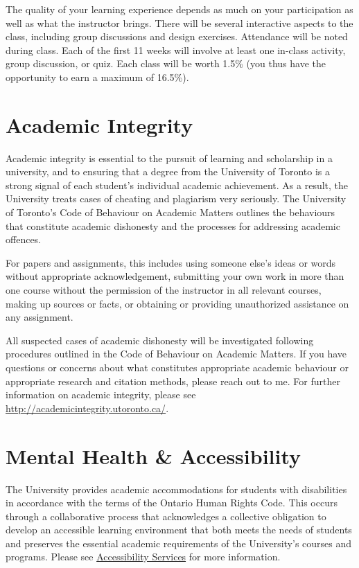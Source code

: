 \documentclass[11pt]{article}
\begin{document}
	The quality of your learning experience depends as much on your participation as well as what the instructor brings. There will be several interactive aspects to the class, including group discussions and design exercises. Attendance will be noted during class. Each of the first 11 weeks will involve at least one in-class activity, group discussion, or quiz. Each class will be worth 1.5\% (you thus have the opportunity to earn a maximum of 16.5\%).
	
	
	
	
	
	\section*{Academic Integrity}
	
	Academic integrity is essential to the pursuit of learning and scholarship in a university, and to ensuring that a degree from the University of Toronto is a strong signal of each student’s individual academic achievement. As a result, the University treats cases of cheating and plagiarism very seriously. The University of Toronto's Code of Behaviour on Academic Matters outlines the behaviours that constitute academic dishonesty and the processes for addressing academic offences. 
	
	For papers and assignments, this includes using someone else's ideas or words without appropriate acknowledgement, submitting your own work in more than one course without the permission of the instructor in all relevant courses,	making up sources or facts, or obtaining or providing unauthorized assistance on any assignment.
	
	All suspected cases of academic dishonesty will be investigated following procedures outlined in the Code of Behaviour on Academic Matters. If you have questions or concerns about what constitutes appropriate academic behaviour or appropriate research and citation methods, please reach out to me. For further information on academic integrity, please see \url{http://academicintegrity.utoronto.ca/}.
	
	
	\section*{Mental Health \& Accessibility}
	
	The University provides academic accommodations for students with disabilities in accordance with the terms of the Ontario Human Rights Code. This occurs through a collaborative process that acknowledges a collective obligation to develop an accessible learning environment that both meets the needs of students and preserves the essential academic requirements of the University's courses and programs. Please see \href{https://studentlife.utoronto.ca/department/accessibility-services/}{Accessibility Services} for more information.
	
\end{document}

